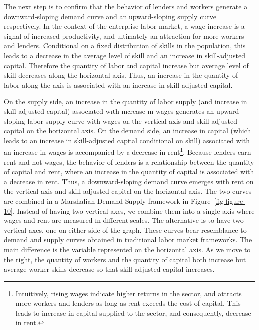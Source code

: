 \documentclass[
  a4paper,
  DIV=11,
  numbers=noendperiod]{scrartcl}
\begin{document}
The next step is to confirm that the behavior of lenders and workers
generate a downward-sloping demand curve and an upward-sloping supply
curve respectively. In the context of the enterprise labor market, a
wage increase is a signal of increased productivity, and ultimately an
attraction for more workers and lenders. Conditional on a fixed
distribution of skills in the population, this leads to a decrease in
the average level of skill and an increase in skill-adjusted capital.
Therefore the quantity of labor and capital increase but average level
of skill decreases along the horizontal axis. Thus, an increase in the
quantity of labor along the axis is associated with an increase in
skill-adjusted capital.

On the supply side, an increase in the quantity of labor supply (and
increase in skill adjusted capital) associated with increase in wages
generates an upward sloping labor supply curve with wages on the
vertical axis and skill-adjusted capital on the horizontal axis. On the
demand side, an increase in capital (which leads to an increase in
skill-adjusted capital conditional on skill) associated with an increase
in wages is accompanied by a decrease in rent\footnote{Intuitively,
  rising wages indicate higher returns in the sector, and attracts more
  workers and lenders as long as rent exceeds the cost of capital. This
  leads to increase in capital supplied to the sector, and consequently,
  decrease in rent.}. Because lenders earn rent and not wages, the
behavior of lenders is a relationship between the quantity of capital
and rent, where an increase in the quantity of capital is associated
with a decrease in rent. Thus, a downward-sloping demand curve emerges
with rent on the vertical axis and skill-adjusted capital on the
horizontal axis. The two curves are combined in a Marshalian
Demand-Supply framework in Figure~\ref{fig-figure-10}. Instead of having
two vertical axes, we combine them into a single axis where wages and
rent are measured in different scales. The alternative is to have two
vertical axes, one on either side of the graph. These curves bear
resemblance to demand and supply curves obtained in traditional labor
market frameworks. The main difference is the variable represented on
the horizontal axis. As we move to the right, the quantity of workers
and the quantity of capital both increase but average worker skills
decrease so that skill-adjusted capital increases.
\end{document}
